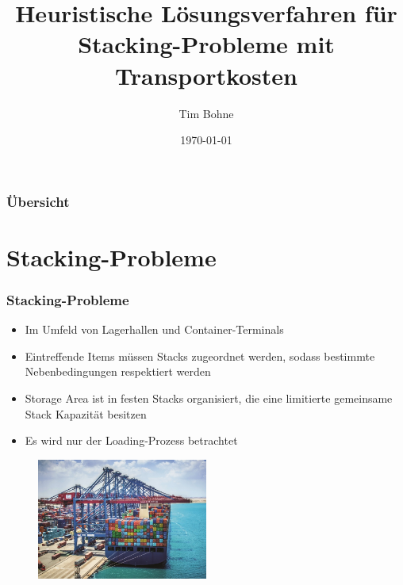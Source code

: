 \documentclass{beamer}
\title[]{Heuristische Lösungsverfahren für Stacking-Probleme mit Transportkosten}
\author{Tim Bohne}
\institute[]
{
\textit{AG Kombinatorische Optimierung}
\medskip
}
\date{\today}
\begin{document}
\begin{frame}[plain] %
\titlepage %
\end{frame}

\begin{frame}
\frametitle{Übersicht} %
\tableofcontents
\end{frame}

\section{Stacking-Probleme}

\begin{frame}
\frametitle{Stacking-Probleme}
\begin{itemize}
\item Im Umfeld von Lagerhallen und Container-Terminals
\item Eintreffende Items müssen Stacks zugeordnet werden, sodass bestimmte Nebenbedingungen respektiert werden
\item Storage Area ist in festen Stacks organisiert, die eine limitierte gemeinsame Stack Kapazität besitzen
\item Es wird nur der Loading-Prozess betrachtet
\end{itemize}
\begin{figure}
\centering
\includegraphics[width=0.5\textwidth]{images/container_terminal.png}
\end{figure}
\end{frame}
\end{document}
